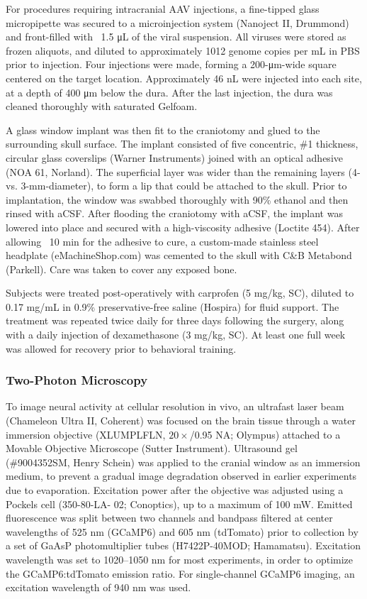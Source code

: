 For procedures requiring intracranial AAV injections, a fine-tipped glass micropipette was secured to a microinjection system (Nanoject II, Drummond) and front-filled with ~1.5 \si{\uL} of the viral suspension. All viruses were stored as frozen aliquots, and diluted to approximately 1012 genome copies per mL in PBS prior to injection. Four injections were made, forming a 200-\si{\um}-wide square centered on the target location. Approximately 46 nL were injected into each site, at a depth of 400 \si{\um} below the dura. After the last injection, the dura was cleaned thoroughly with saturated Gelfoam.

A glass window implant was then fit to the craniotomy and glued to the surrounding skull surface. The implant consisted of five concentric, \#1 thickness, circular glass coverslips (Warner Instruments) joined with an optical adhesive (NOA 61, Norland). The superficial layer was wider than the remaining layers (4- vs. 3-mm-diameter), to form a lip that could be attached to the skull. Prior to implantation, the window was swabbed thoroughly with 90\% ethanol and then rinsed with aCSF. After flooding the craniotomy with aCSF, the implant was lowered into place and secured with a high-viscosity adhesive (Loctite 454). After allowing ~10 min for the adhesive to cure, a custom-made stainless steel headplate (eMachineShop.com) was cemented to the skull with C\&B Metabond (Parkell). Care was taken to cover any exposed bone.

Subjects were treated post-operatively with carprofen (5 mg/kg, SC), diluted to 0.17 mg/mL in 0.9\% preservative-free saline (Hospira) for fluid support. The treatment was repeated twice daily for three days following the surgery, along with a daily injection of dexamethasone (3 mg/kg, SC). At least one full week was allowed for recovery prior to behavioral training.

\subsubsection*{Two-Photon Microscopy}
To image neural activity at cellular resolution in vivo, an ultrafast laser beam (Chameleon Ultra II, Coherent) was focused on the brain tissue through a water immersion objective (XLUMPLFLN, $20\times$/0.95 NA; Olympus) attached to a Movable Objective Microscope (Sutter Instrument). Ultrasound gel (\#9004352SM, Henry Schein) was applied to the cranial window as an immersion medium, to prevent a gradual image degradation observed in earlier experiments due to evaporation.
Excitation power after the objective was adjusted using a Pockels cell (350-80-LA-
02; Conoptics), up to a maximum of 100 mW. Emitted fluorescence was split between two channels and bandpass filtered at center wavelengths of 525 nm (GCaMP6) and 605 nm (tdTomato) prior to collection by a set of GaAsP photomultiplier tubes (H7422P-40MOD; Hamamatsu). Excitation wavelength was set to 1020--1050 nm for most experiments, in order to optimize the GCaMP6:tdTomato emission ratio. For single-channel GCaMP6 imaging, an excitation wavelength of 940 nm was used.

